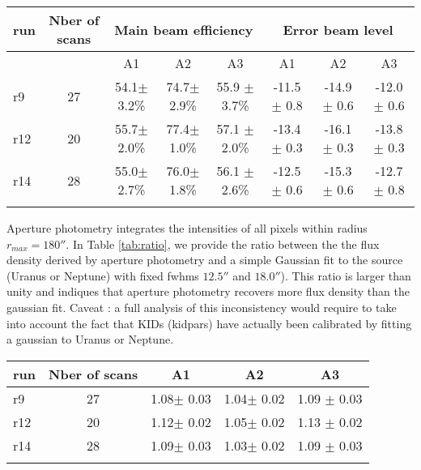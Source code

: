 \begin{table*}[!h]
\caption{Main beam efficiency and level of error beam}
\label{tab:MB}
\centering
\begin{tabular}{l| c | c c c | c c c}
\hline\hline
\noalign{\smallskip}
run  & Nber of scans & \multicolumn{3}{c}{Main beam efficiency } & \multicolumn{3}{c}{Error beam level} \\
\hline
     &               &  A1    &    A2   &  A3  & A1  &  A2  & A3   \\
            \hline
r9    & 27  &  54.1$\pm$ 3.2\%    &  74.7$\pm$ 2.9\% & 55.9 $\pm$ 3.7\%   &  -11.5 $\pm$ 0.8    &  -14.9 $\pm$ 0.6   &  -12.0 $\pm$ 0.6   \\
r12   & 20  &  55.7$\pm$ 2.0\%    &  77.4$\pm$ 1.0\% & 57.1 $\pm$ 2.0\%   &  -13.4 $\pm$ 0.3    &  -16.1 $\pm$ 0.3   &  -13.8 $\pm$ 0.3   \\
r14   & 28  &  55.0$\pm$ 2.7\%    &  76.0$\pm$ 1.8\% & 56.1 $\pm$ 2.6\%   &  -12.5 $\pm$ 0.6    &  -15.3 $\pm$ 0.6   &  -12.7 $\pm$ 0.8   \\
            \noalign{\smallskip}
            \hline
\end{tabular}
\end{table*}


Aperture photometry integrates the intensities of all pixels within radius $r_{max}=180''$. In Table \ref{tab:ratio}, we provide the ratio between the 
the flux density derived by aperture photometry and a simple Gaussian fit to the source (Uranus or Neptune) with fixed fwhms $12.5''$ and $18.0''$).
This ratio is larger than unity and indiques that aperture photometry recovers more flux density than the gaussian fit. Caveat : a full analysis
of this inconsistency would require to take into account the fact that KIDs (kidpars) have actually been calibrated by fitting a gaussian to Uranus 
or Neptune.    


\begin{table*}[!h]
\caption{ratio aperture photometry / gaussian fit flux densities   }
\label{tab:ratio}
\centering
\begin{tabular}{l| c | c c c }
\hline\hline
\noalign{\smallskip}
run     & Nber of scans  &  A1    &    A2   &  A3    \\
\hline
r9    & 27  &  1.08$\pm$ 0.03    &  1.04$\pm$ 0.02 & 1.09 $\pm$ 0.03     \\
r12   & 20  &  1.12$\pm$ 0.02    &  1.05$\pm$ 0.02 & 1.13 $\pm$ 0.02     \\
r14   & 28  &  1.09$\pm$ 0.03    &  1.03$\pm$ 0.02 & 1.09 $\pm$ 0.03     \\
\noalign{\smallskip}
\hline
\end{tabular}
\end{table*}
